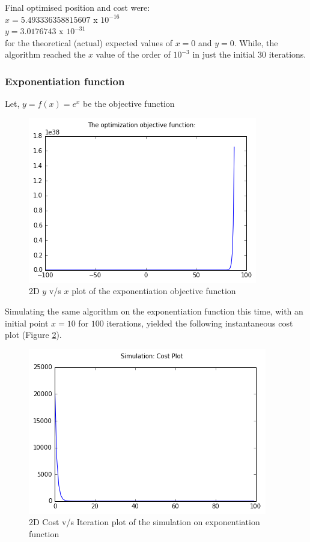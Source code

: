 \documentclass{article}
\begin{document}
Final optimised position and cost were:\\
$x = 5.493336358815607$ x $10^{-16}$\\
$y = 3.0176743$ x $10^{-31}$\\

for the theoretical (actual) expected values of $x = 0$ and $y = 0$. While, the algorithm reached the $x$ value of the order of $10^{-3}$ in just the initial 30 iterations.

\subsubsection{Exponentiation function}
\begin{center}
	Let, $y = f(x) = e^x$ be the objective function
\end{center}

\begin{figure}[h]
\begin{center}
\includegraphics[scale=0.5]{diagrams/exponentiation_function.png}
\end{center}
\caption{2D $y$ v/s $x$ plot of the exponentiation objective function}
\label{fig:figure_4}
\end{figure}

Simulating the same algorithm on the exponentiation function this time, with an initial point $x = 10$ for $100$ iterations, yielded the following instantaneous cost plot (Figure \ref{fig:figure_5}). 

\begin{figure}[h]
\begin{center}
\includegraphics[scale=0.5]{diagrams/ranik_on_exponentiation.png}
\end{center}
\caption{2D Cost v/s Iteration plot of the simulation on exponentiation function}
\label{fig:figure_5}
\end{figure}
\end{document}
